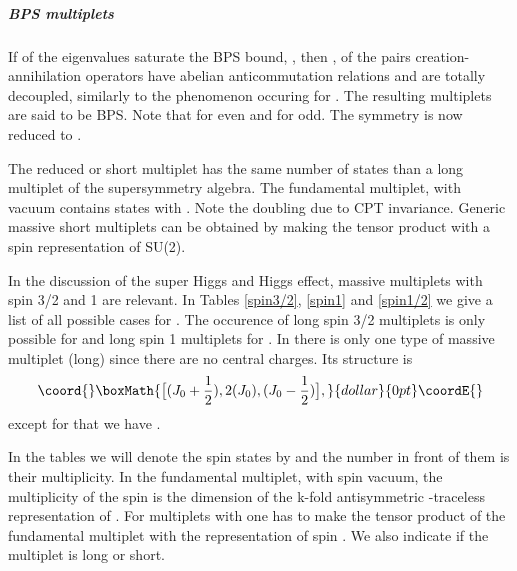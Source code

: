 \documentclass[a4paper,12pt]{article}
\begin{document}
\subparagraph{BPS multiplets} If \coordHE{} of the eigenvalues \coordHE{}
saturate the BPS bound, \coordHE{}, \coordHE{} then \coordHE{}, of the
pairs creation-annihilation operators have abelian anticommutation
relations and are totally decoupled, similarly to the phenomenon
occuring for \coordHE{}. The resulting multiplets are said to be \coordHE{}
BPS. Note that \coordHE{} for \coordHE{} even and \coordHE{}
for \coordHE{} odd. The \coordHE{} symmetry is now reduced to
\coordHE{}.

The reduced or short multiplet has the same number of states than a long multiplet of the \coordHE{}
supersymmetry algebra. The fundamental multiplet, with \coordHE{} vacuum  contains \coordHE{}
 states with \coordHE{}. Note the doubling due to CPT invariance.
 Generic massive short multiplets can be obtained by making the tensor product
 with a spin \coordHE{} representation of SU(2).

\bigskip

In the discussion of the super Higgs and Higgs  effect, massive multiplets with spin 3/2 and 1 are
 relevant. In Tables \ref{spin3/2}, \ref{spin1} and \ref{spin1/2} we give a list of all possible
  cases for \coordHE{}. The occurence of long spin 3/2 multiplets is only possible for \coordHE{} and long spin
   1 multiplets for \coordHE{}. In \coordHE{} there is only one type of massive multiplet (long) since there are
    no central charges. Its structure is
$$\coord{}\boxMath{\bigl[(J_0+\frac{1}{2}),2(J_0),(J_0-\frac{1}{2})\bigr],}{dollar}{0pt}\coordE{}$$ except
for \coordHE{} that we have
 \coordHE{}.


In the tables we will denote the spin states by \coordHE{} and the
number in front of them is their multiplicity. In the fundamental
multiplet, with spin \coordHE{} vacuum, the multiplicity of the spin
\coordHE{}  is the dimension of the  k-fold antisymmetric
\myHighlight{$\Omega$}\coordHE{}-traceless  representation of \coordHE{}. For multiplets
with \coordHE{} one has to make the tensor product of the
fundamental multiplet with the representation of spin \coordHE{}. We
also indicate if the multiplet is long or short.
\end{document}
